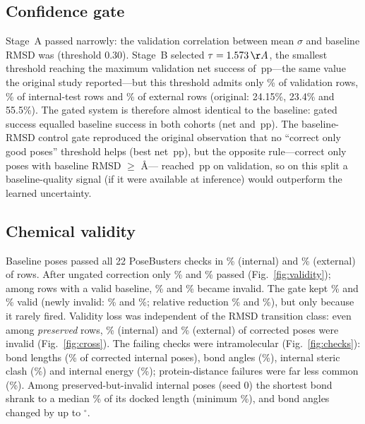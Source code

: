 \documentclass[preprint,12pt,authoryear]{elsarticle}
\newcommand{\Ang}{\,\AA}
\begin{document}
\subsection{Confidence gate}
Stage~A passed narrowly: the validation correlation between mean $\sigma$ and baseline RMSD was \StageA{} (threshold 0.30).
Stage~B selected $\tau=\Tau\Ang$, the smallest threshold reaching the maximum validation net success of \ValNet\,pp---the
same value the original study reported---but this threshold admits only \AdmitVal\% of validation rows, \AdmitInt\% of
internal-test rows and \AdmitExt\% of external rows (original: 24.15\%, 23.4\% and 55.5\%). The gated system is therefore
almost identical to the baseline: gated success equalled baseline success in both cohorts (net \NetGatInt{} and
\NetGatExt\,pp). The baseline-RMSD control gate reproduced the original observation that no ``correct only good poses''
threshold helps (best net \CtrlLe\,pp), but the opposite rule---correct only poses with baseline RMSD $\ge$\,\CtrlGeT\Ang---
reached \CtrlGe\,pp on validation, so on this split a baseline-quality signal (if it were available at inference) would
outperform the learned uncertainty.

\subsection{Chemical validity}
Baseline poses passed all 22 PoseBusters checks in \PassBaseInt\% (internal) and \PassBaseExt\% (external) of rows. After
ungated correction only \PassUngInt\% and \PassUngExt\% passed (Fig.~\ref{fig:validity}); among rows with a valid baseline,
\NewInvUngInt\% and \NewInvUngExt\% became invalid. The gate kept \PassGatInt\% and \PassGatExt\% valid (newly invalid:
\NewInvGatInt\% and \NewInvGatExt\%; relative reduction \RelRedInt\% and \RelRedExt\%), but only because it rarely fired.
Validity loss was independent of the RMSD transition class: even among \emph{preserved} rows, \InvIntPreservation\% (internal)
and \InvExtPreservation\% (external) of corrected poses were invalid (Fig.~\ref{fig:cross}). The failing checks were
intramolecular (Fig.~\ref{fig:checks}): bond lengths (\ChkIntBondlengths\% of corrected internal poses), bond angles
(\ChkIntBondangles\%), internal steric clash (\ChkIntInternalstericclash\%) and internal energy (\ChkIntInternalenergy\%);
protein-distance failures were far less common (\ChkIntMinimumdistancetoprotein\%). Among \SpotN{} preserved-but-invalid
internal poses (seed 0) the shortest bond shrank to a median \SpotBondMed\% of its docked length (minimum \SpotBondMin\%),
and bond angles changed by up to \SpotAngleMax$^\circ$.
\end{document}

